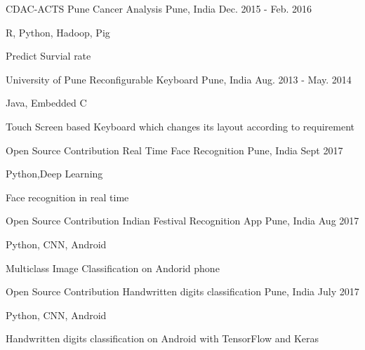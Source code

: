 

\begin{cventries}

  \cventry
    {CDAC-ACTS Pune} %
    {Cancer Analysis} %
    {Pune, India} %
    {Dec. 2015 - Feb. 2016} %
    {
      \begin{cvitems} %
        \item {R, Python, Hadoop, Pig}
        \item {Predict Survial rate}
      \end{cvitems}
    }
  
  \cventry
    {University of Pune} %
    {Reconfigurable Keyboard} %
    {Pune, India} %
    {Aug. 2013 - May. 2014} %
    {
      \begin{cvitems} %
        \item {Java, Embedded C}
        \item {Touch Screen based Keyboard which changes its layout according to requirement}
      \end{cvitems}
    }

  \cventry
    {Open Source Contribution} %
    {Real Time Face Recognition} %
    {Pune, India} %
    {Sept 2017} %
    {
      \begin{cvitems} %
        \item {Python,Deep Learning}
        \item {Face recognition in real time}
      \end{cvitems}
    }
    \cventry
    {Open Source Contribution} %
    {Indian Festival Recognition App} %
    {Pune, India} %
    {Aug 2017} %
    {
      \begin{cvitems} %
        \item {Python, CNN, Android}
        \item {Multiclass Image Classification on Andorid phone}
      \end{cvitems}
    }
    \cventry
    {Open Source Contribution} %
    {Handwritten digits classification} %
    {Pune, India} %
    {July 2017} %
    {
      \begin{cvitems} %
        \item {Python, CNN, Android}
        \item {Handwritten digits classification on Android with TensorFlow and Keras}
      \end{cvitems}
    }



\end{cventries}
